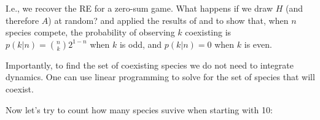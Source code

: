 \documentclass[]{book}
\newenvironment{Shaded}{\begin{snugshade}}{\end{snugshade}}
\newcommand{\CommentTok}[1]{\textcolor[rgb]{0.56,0.35,0.01}{\textit{#1}}}
\newcommand{\ControlFlowTok}[1]{\textcolor[rgb]{0.13,0.29,0.53}{\textbf{#1}}}
\newcommand{\DecValTok}[1]{\textcolor[rgb]{0.00,0.00,0.81}{#1}}
\newcommand{\KeywordTok}[1]{\textcolor[rgb]{0.13,0.29,0.53}{\textbf{#1}}}
\newcommand{\NormalTok}[1]{#1}
\newcommand{\OperatorTok}[1]{\textcolor[rgb]{0.81,0.36,0.00}{\textbf{#1}}}
\newcommand{\StringTok}[1]{\textcolor[rgb]{0.31,0.60,0.02}{#1}}
\begin{document}
I.e., we recover the RE for a zero-sum game. What happens if we draw \(H\) (and therefore \(A\)) at random? \citet{allesina2011competitive} and \citet{grilli2017higher} applied the results of \citet{fisher1995optimal} and \citet{brandl2017distribution} to show that, when \(n\) species compete, the probability of observing \(k\) coexisting is \(p(k|n) = \binom{n}{k} 2^{1-n}\) when \(k\) is odd, and \(p(k|n) = 0\) when \(k\) is even.

Importantly, to find the set of coexisting species we do not need to integrate dynamics. One can use linear programming to solve for the set of species that will coexist.

\begin{Shaded}
\end{Shaded}

Now let's try to count how many species suvive when starting with 10:
\end{document}
